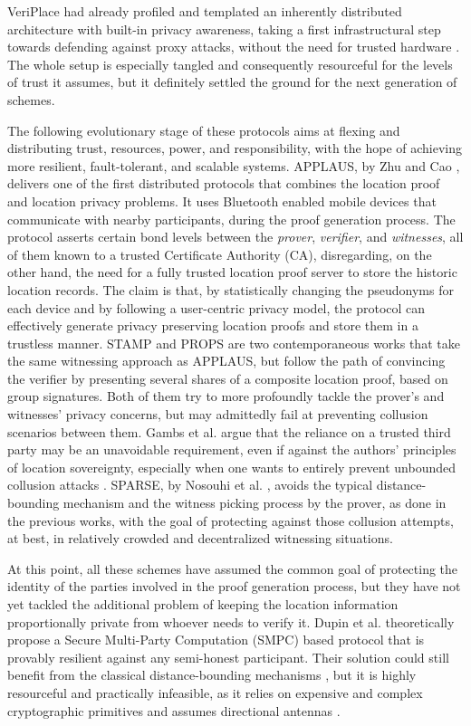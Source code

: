 VeriPlace had already profiled and templated an inherently distributed architecture with built-in privacy awareness, taking a first infrastructural step towards defending against proxy attacks, without the need for trusted hardware \cite{luo2010veriplace}. The whole setup is especially tangled and consequently resourceful for the levels of trust it assumes, but it definitely settled the ground for the next generation of \pol{} schemes. 

The following evolutionary stage of these protocols aims at flexing and distributing trust, resources, power, and responsibility, with the hope of achieving more resilient, fault-tolerant, and scalable systems. APPLAUS, by Zhu and Cao \cite{zhu2011applaus}, delivers one of the first distributed protocols that combines the location proof and location privacy problems. It uses Bluetooth enabled mobile devices that communicate with nearby participants, during the proof generation process. The protocol asserts certain bond levels between the \emph{prover}, \emph{verifier}, and \emph{witnesses}, all of them known to a trusted Certificate Authority (CA), disregarding, on the other hand, the need for a fully trusted location proof server to store the historic location records. The claim is that, by statistically changing the pseudonyms for each device and by following a user-centric privacy model, the protocol can effectively generate privacy preserving location proofs and store them in a trustless manner. STAMP \cite{wang2016stamp} and PROPS \cite{gambs2014props} are two contemporaneous works that take the same witnessing approach as APPLAUS, but follow the path of convincing the verifier by presenting several shares of a composite location proof, based on group signatures. Both of them try to more profoundly tackle the prover's and witnesses' privacy concerns, but may admittedly fail at preventing collusion scenarios between them. Gambs et al. argue that the reliance on a trusted third party may be an unavoidable requirement, even if against the authors' principles of location sovereignty, especially when one wants to entirely prevent unbounded collusion attacks \cite{gambs2014props}. SPARSE, by Nosouhi et al. \cite{nosouhi2018sparse}, avoids the typical distance-bounding mechanism and the witness picking process by the prover, as done in the previous works, with the goal of protecting against those collusion attempts, at best, in relatively crowded and decentralized witnessing situations. 

At this point, all these schemes have assumed the common goal of protecting the identity of the parties involved in the proof generation process, but they have not yet tackled the additional problem of keeping the location information proportionally private from whoever needs to verify it. Dupin et al. \cite{dupin2018location} theoretically propose a Secure Multi-Party Computation (SMPC) based protocol that is provably resilient against any semi-honest participant. Their solution could still benefit from the classical distance-bounding mechanisms \cite{dupin2018location}, but it is highly resourceful and practically infeasible, as it relies on expensive and complex cryptographic primitives and assumes directional antennas \cite{yang2021group}.

